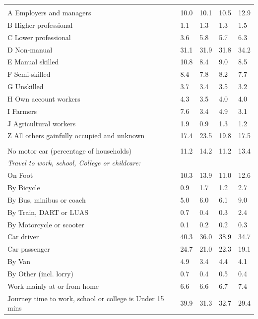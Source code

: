 \documentclass{article}
\begin{document}
\begin{table}[h]
\begin{tabular}{KTTTT}
\hline
    \\ 
    \hline
A Employers and managers & 10.0& 10.1& 10.5& 12.9\\
B Higher professional & 1.1& 1.3& 1.3& 1.5\\
C Lower professional & 3.6& 5.8& 5.7& 6.3\\
D Non-manual & 31.1& 31.9& 31.8& 34.2\\
E Manual skilled & 10.8&  8.4&  9.0&  8.5\\
F Semi-skilled & 8.4& 7.8& 8.2& 7.7\\
G Unskilled & 3.7& 3.4& 3.5& 3.2\\
H Own account workers & 4.3& 3.5& 4.0& 4.0\\
I Farmers & 7.6& 3.4& 4.9& 3.1\\
J Agricultural workers & 1.9& 0.9& 1.3& 1.2\\
Z All others gainfully occupied and unknown & 17.4& 23.5& 19.8& 17.5\\
\hline
{}\hline
    \\ 
    \hline
No motor car (percentage of households) & 11.2& 14.2& 11.2& 
13.4\\
    \hline 
\emph{Travel to work, school, College or childcare:} & & & \\
\quad On Foot & 10.3& 13.9& 11.0& 12.6\\ 
\quad By Bicycle & 0.9& 1.7& 1.2& 2.7\\ 
\quad By Bus, minibus or coach & 5.0& 6.0& 6.1& 9.0\\
\quad By Train, DART or LUAS & 0.7& 0.4& 0.3& 2.4\\
\quad By Motorcycle or scooter & 0.1& 0.2& 0.2& 0.3\\
\quad Car driver & 40.3 & 36.0& 38.9& 34.7\\
\quad Car passenger & 24.7& 21.0& 22.3& 19.1\\
\quad By Van & 4.9& 3.4& 4.4& 4.1\\
\quad By Other (incl. lorry) & 0.7& 0.4& 0.5& 0.4\\
    \hline
Work mainly at or from home & 6.6& 6.6& 6.7& 7.4\\
Journey time to work, school or college is Under 15 mins & 39.9& 31.3& 32.7& 29.4\\

\end{tabular}
\end{table}
\end{document}
